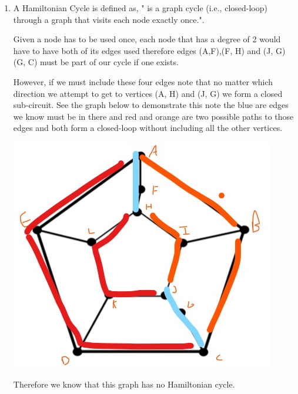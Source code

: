 \documentclass{article}
\begin{document}
\begin{enumerate}
\begin{enumerate}
        \item A Hamiltonian Cycle is defined as, " is a graph cycle (i.e., closed-loop) through a graph that visits each node exactly once.".
 
        Given a node has to be used once, each node that has a degree of 2 would have to have both of its edges used therefore edges (A,F),(F, H) and (J, G)(G, C) must be part of our cycle if one exists. 
        
        However, if we must include these four edges note that no matter which direction we attempt to get to vertices (A, H) and (J, G) we form a closed sub-circuit. 
        See the graph below to demonstrate this note the blue are edges we know must be in there and red and orange are two possible paths to those edges and both form a closed-loop without including all the other vertices.

        \includegraphics[scale=0.3]{1_Graph2.jpg}

        Therefore we know that this graph has no Hamiltonian cycle.


\end{enumerate}
\end{enumerate}
\end{document}
